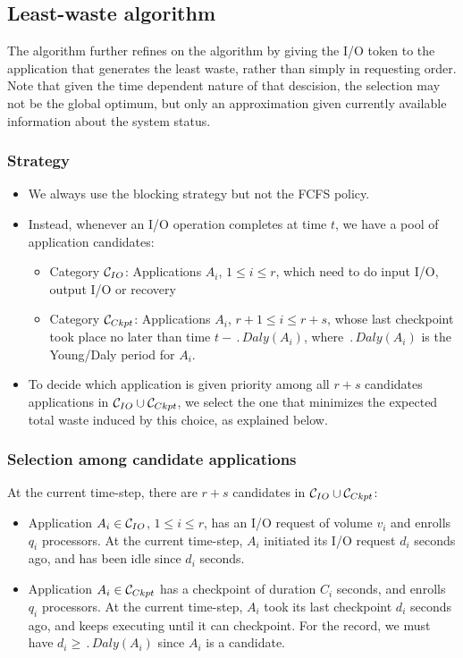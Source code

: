 \subsection{Least-waste algorithm}

The \leastwaste algorithm further refines on the \fifononblock algorithm
by giving the I/O token to the application that generates the least
waste, rather than simply in requesting order. Note that given the time
dependent nature of that descision, the selection may
not be the global optimum, but only an approximation given currently
available information about the system status.



\subsubsection{Strategy}

\begin{itemize}
  \item We always use the blocking strategy but not the FCFS policy.
  \item Instead, whenever an I/O operation completes at time $t$, we have a pool of application candidates:
  \begin{itemize}
   \item Category \IOcat $\mathcal{C}_{IO}$: Applications $A_{i}$, $1\leq i \leq r$, which need to do input I/O, output I/O or recovery
  \item Category \Ckptcat $\mathcal{C}_{Ckpt}$: Applications $A_{i}$, $r+1\leq i \leq r+s$,
  whose last checkpoint took place no later than time $t - \period{Daly}(A_{i})$, where $\period{Daly}(A_{i})$ is the Young/Daly period for $A_{i}$.
  \end{itemize}
  \item To decide which application is given priority among all $r+s$ candidates applications in $\mathcal{C}_{IO} \cup \mathcal{C}_{Ckpt}$, we select the one that minimizes the expected total waste induced by this choice, as explained below.
  \end{itemize}

 \subsubsection{Selection among candidate applications}

At the current time-step, there are $r+s$ candidates in $\mathcal{C}_{IO} \cup \mathcal{C}_{Ckpt}$:
\begin{itemize}
  \item Application $A_{i} \in \mathcal{C}_{IO}$, $1\leq i \leq r$,
  has an I/O request of volume $v_{i}$ and enrolls $q_{i}$ processors. At the current time-step, $A_{i}$ initiated its I/O request $d_{i}$ seconds ago, and has been idle since $d_{i}$ seconds.
 \item Application $A_{i} \in  \mathcal{C}_{Ckpt}$ has a checkpoint of duration $C_{i}$ seconds,
  and enrolls $q_{i}$ processors. At the current time-step, $A_{i}$ took its last checkpoint
  $d_{i}$ seconds ago, and keeps executing until it can checkpoint. For the record, we must have $d_{i} \geq \period{Daly}(A_{i})$
  since $A_{i}$ is a candidate.
  \end{itemize}


